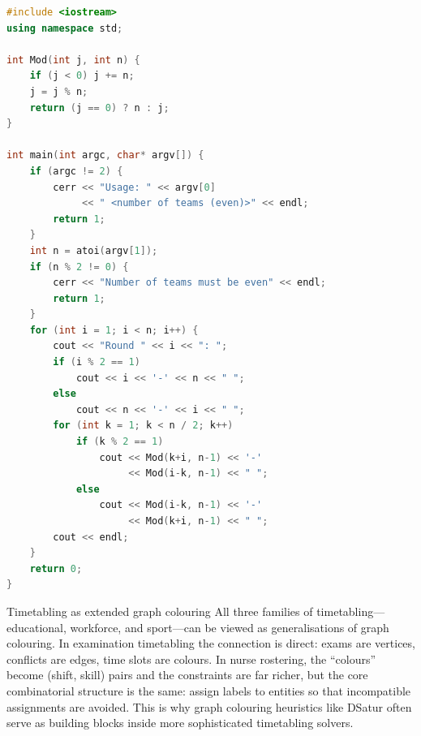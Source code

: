 \begin{lstlisting}[language=C++,
  caption={Canonical round-robin pattern generator
           (compile with \texttt{g++ -Wall -o pattern pattern.cpp}).},
  label={lst:pattern-generator}]
#include <iostream>
using namespace std;

int Mod(int j, int n) {
    if (j < 0) j += n;
    j = j % n;
    return (j == 0) ? n : j;
}

int main(int argc, char* argv[]) {
    if (argc != 2) {
        cerr << "Usage: " << argv[0]
             << " <number of teams (even)>" << endl;
        return 1;
    }
    int n = atoi(argv[1]);
    if (n % 2 != 0) {
        cerr << "Number of teams must be even" << endl;
        return 1;
    }
    for (int i = 1; i < n; i++) {
        cout << "Round " << i << ": ";
        if (i % 2 == 1)
            cout << i << '-' << n << " ";
        else
            cout << n << '-' << i << " ";
        for (int k = 1; k < n / 2; k++)
            if (k % 2 == 1)
                cout << Mod(k+i, n-1) << '-'
                     << Mod(i-k, n-1) << " ";
            else
                cout << Mod(i-k, n-1) << '-'
                     << Mod(k+i, n-1) << " ";
        cout << endl;
    }
    return 0;
}
\end{lstlisting}

\begin{intermezzo}{Timetabling as extended graph colouring}
All three families of timetabling---educational, workforce, and
sport---can be viewed as generalisations of graph colouring.
In examination timetabling the connection is direct: exams are
vertices, conflicts are edges, time slots are colours.
In nurse rostering, the ``colours'' become (shift, skill) pairs
and the constraints are far richer, but the core combinatorial
structure is the same: assign labels to entities so that
incompatible assignments are avoided.  This is why graph colouring
heuristics like DSatur often serve as building blocks inside
more sophisticated timetabling solvers.
\end{intermezzo}
